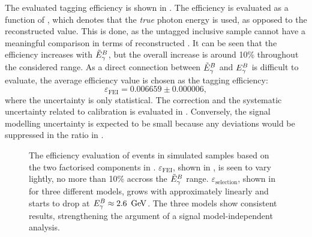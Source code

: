 The evaluated tagging efficiency is shown in .
The efficiency is evaluated as a function of \EtildeB, which denotes that the \textit{true} photon energy is used, 
as opposed to the reconstructed value.
This is done, as the untagged inclusive sample cannot have a meaningful comparison in terms of reconstructed \EB.
It can be seen that the efficiency increases with ${\tilde{E}_{\gamma}^B}$, but the overall increase is around 10\% throughout the considered range.
As a direct connection between ${\tilde{E}_{\gamma}^B}$ and ${E^B_{\gamma}}$ is difficult to evaluate, the average efficiency value is chosen as the tagging efficiency:
\begin{equation}\label{eq:avg_efficiency_fei}
    \varepsilon_{\mathrm{FEI}} = 0.006659 \pm 0.000006,
\end{equation}
where the uncertainty is only statistical.
The correction and the systematic uncertainty related to \FEI calibration is evaluated in .
Conversely, the signal modelling uncertainty is expected to be small because any deviations would be suppressed in the ratio in .
\begin{figure}[htbp!]
    \centering
    \caption{\label{fig:epsilon} The efficiency evaluation of \BtoXsgamma events in simulated samples based on the two factorised components in
    .
    $\varepsilon_{\mathrm{FEI}}$, shown in , is seen to vary lightly, no more than 10\% accross the ${\tilde{E}_{\gamma}^B}$ range.
    $\varepsilon_{\mathrm{selection}}$, shown in  for three different models,
    grows with \EB approximately linearly and starts to drop at ${E^B_{\gamma}}\approx2.6~\mathrm{\,Ge\kern -0.1em V}$.
    The three models show consistent results, strengthening the argument of a signal model-independent analysis.
    }
\end{figure}

